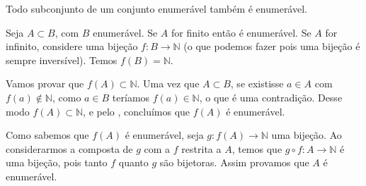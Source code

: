 \documentclass[../main.tex]{subfiles}
\begin{document}
\begin{teo}\label{enum-teo-subconjuntoConjuntoEnumeravelEnumeravel}
    Todo subconjunto de um conjunto enumerável também é enumerável.
\end{teo}
\begin{dem}
    Seja $A \subset B$, com $B$ enumerável. Se $A$ for finito então é enumerável. Se $A$ for infinito, considere uma bijeção $f \colon B \to \mathbb{N}$ (o que podemos fazer pois uma bijeção é sempre inversível). Temos $f(B) = \mathbb{N}$. 

    Vamos provar que $f(A) \subset \mathbb{N}$. Uma vez que $A \subset B$, se existisse $a \in A$ com $f(a) \not\in \mathbb{N}$, como
    $a \in B$ teríamos $f(a) \in \mathbb{N}$, o que é uma contradição. Desse modo $f(A) \subset \mathbb{N}$, e pelo , concluímos que $f(A)$ é enumerável.

    Como sabemos que $f(A)$ é enumerável, seja $g \colon f(A) \to \mathbb{N}$ uma bijeção. Ao considerarmos a composta de $g$ com a $f$ restrita a $A$, temos que $g \circ f \colon A \to \mathbb{N}$ é uma bijeção, pois tanto $f$ quanto $g$ são bijetoras. Assim provamos que $A$ é enumerável.
\end{dem}

    
        
\end{document}
